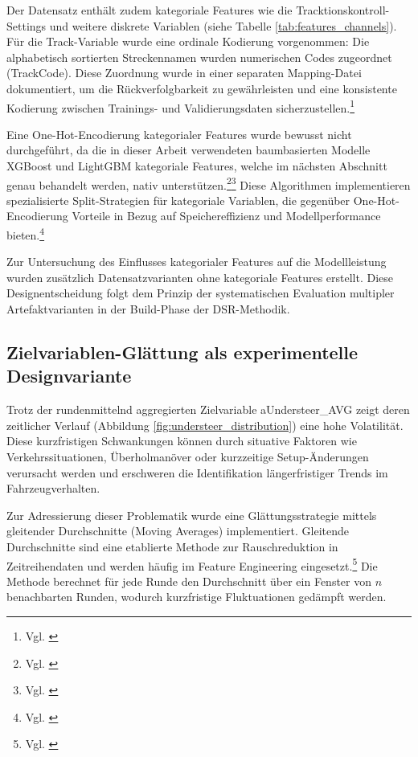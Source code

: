 Der Datensatz enthält zudem kategoriale Features wie die Tracktionskontroll-Settings und weitere diskrete Variablen (siehe Tabelle \ref{tab:features_channels}). Für die Track-Variable wurde eine ordinale Kodierung vorgenommen: Die alphabetisch sortierten Streckennamen wurden numerischen Codes zugeordnet (TrackCode). Diese Zuordnung wurde in einer separaten Mapping-Datei dokumentiert, um die Rückverfolgbarkeit zu gewährleisten und eine konsistente Kodierung zwischen Trainings- und Validierungsdaten sicherzustellen.\footnote{Vgl. \cite{Chen2016}}

Eine One-Hot-Encodierung kategorialer Features wurde bewusst nicht durchgeführt, da die in dieser Arbeit verwendeten baumbasierten Modelle XGBoost und LightGBM kategoriale Features, welche im nächsten Abschnitt genau behandelt werden, nativ unterstützen.\footnote{Vgl. \cite{Chen2016}}\footnote{Vgl. \cite{Ke2017}} Diese Algorithmen implementieren spezialisierte Split-Strategien für kategoriale Variablen, die gegenüber One-Hot-Encodierung Vorteile in Bezug auf Speichereffizienz und Modellperformance bieten.\footnote{Vgl. \cite{Chen2016}}

Zur Untersuchung des Einflusses kategorialer Features auf die Modellleistung wurden zusätzlich Datensatzvarianten ohne kategoriale Features erstellt. Diese Designentscheidung folgt dem Prinzip der systematischen Evaluation multipler Artefaktvarianten in der Build-Phase der DSR-Methodik.


\subsection{Zielvariablen-Glättung als experimentelle Designvariante}

Trotz der rundenmittelnd aggregierten Zielvariable aUndersteer\_AVG zeigt deren zeitlicher Verlauf (Abbildung \ref{fig:understeer_distribution}) eine hohe Volatilität. Diese kurzfristigen Schwankungen können durch situative Faktoren wie Verkehrssituationen, Überholmanöver oder kurzzeitige Setup-Änderungen verursacht werden und erschweren die Identifikation längerfristiger Trends im Fahrzeugverhalten.

Zur Adressierung dieser Problematik wurde eine Glättungsstrategie mittels gleitender Durchschnitte (Moving Averages) implementiert. Gleitende Durchschnitte sind eine etablierte Methode zur Rauschreduktion in Zeitreihendaten und werden häufig im Feature Engineering eingesetzt.\footnote{Vgl. \cite{Brownlee2020}} Die Methode berechnet für jede Runde den Durchschnitt über ein Fenster von $n$ benachbarten Runden, wodurch kurzfristige Fluktuationen gedämpft werden.


